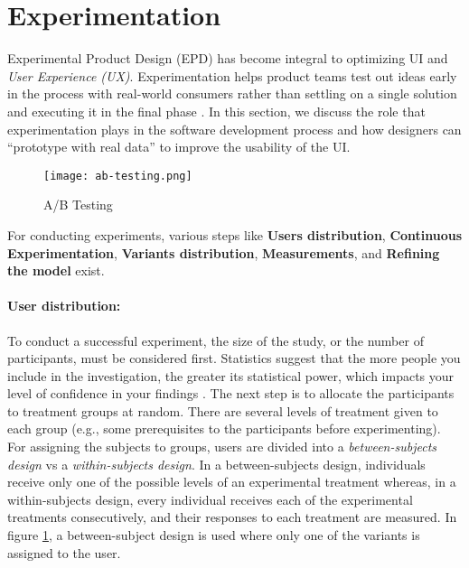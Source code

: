 \section{Experimentation}
\label{background:section:experimentproduct}
Experimental Product Design (EPD) has become integral to optimizing UI and \textit{User Experience (UX)}.
Experimentation helps product teams test out ideas early in the process with real-world consumers rather than settling on a single solution and executing it in the final phase \cite{misc:CE:miklos}.
In this section, we discuss the role that experimentation plays in the software development process and how designers can ``prototype with real data'' to improve the usability of the UI.
\begin{figure}[htbp!]
  \centering    
  \texttt{[image: ab-testing.png]}
  \caption[A/B Testing]{A/B Testing}
  \label{fig:background:abtesting}
\end{figure}
For conducting experiments, various steps like \textbf{Users distribution}, \textbf{Continuous Experimentation}, \textbf{Variants distribution}, \textbf{Measurements}, and \textbf{Refining the model} exist.  

\paragraph{User distribution:} To conduct a successful experiment, the size of the study, or the number of participants, must be considered first.
Statistics suggest that the more people you include in the investigation, the greater its statistical power, which impacts your level of confidence in your findings \cite{misc:experimentation:users}.
The next step is to allocate the participants to treatment groups at random. 
There are several levels of treatment given to each group (e.g., some prerequisites to the participants before experimenting).
For assigning the subjects to groups, users are divided into a \textit{between-subjects design} vs a \textit{within-subjects design}.
In a between-subjects design, individuals receive only one of the possible levels of an experimental treatment whereas, in a within-subjects design, every individual receives each of the experimental treatments consecutively, and their responses to each treatment are measured.
In figure \ref{fig:background:abtesting}, a between-subject design is used where only one of the variants is assigned to the user.

